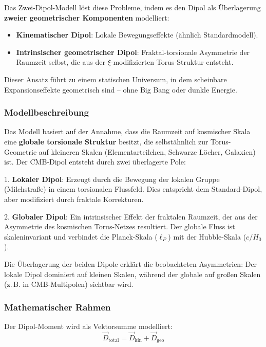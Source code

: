 	Das Zwei-Dipol-Modell löst diese Probleme, indem es den Dipol als Überlagerung \textbf{zweier geometrischer Komponenten} modelliert:
	\begin{itemize}
		\item \textbf{Kinematischer Dipol}: Lokale Bewegungseffekte (ähnlich Standardmodell).
		\item \textbf{Intrinsischer geometrischer Dipol}: Fraktal-torsionale Asymmetrie der Raumzeit selbst, die aus der $\xi$-modifizierten Torus-Struktur entsteht.
	\end{itemize}
	
	Dieser Ansatz führt zu einem statischen Universum, in dem scheinbare Expansionseffekte geometrisch sind – ohne Big Bang oder dunkle Energie.
	
	\subsubsection{Modellbeschreibung}
	
	Das Modell basiert auf der Annahme, dass die Raumzeit auf kosmischer Skala eine \textbf{globale torsionale Struktur} besitzt, die selbstähnlich zur Torus-Geometrie auf kleineren Skalen (Elementarteilchen, Schwarze Löcher, Galaxien) ist. Der CMB-Dipol entsteht durch zwei überlagerte Pole:
	
	1. \textbf{Lokaler Dipol}: Erzeugt durch die Bewegung der lokalen Gruppe (Milchstraße) in einem torsionalen Flussfeld. Dies entspricht dem Standard-Dipol, aber modifiziert durch fraktale Korrekturen.
	
	2. \textbf{Globaler Dipol}: Ein intrinsischer Effekt der fraktalen Raumzeit, der aus der Asymmetrie des kosmischen Torus-Netzes resultiert. Der globale Fluss ist skaleninvariant und verbindet die Planck-Skala ($\ell_P$) mit der Hubble-Skala ($c/H_0$).
	
	Die Überlagerung der beiden Dipole erklärt die beobachteten Asymmetrien: Der lokale Dipol dominiert auf kleinen Skalen, während der globale auf großen Skalen (z.\,B. in CMB-Multipolen) sichtbar wird.
	
	\subsubsection{Mathematischer Rahmen}
	
	Der Dipol-Moment wird als Vektorsumme modelliert:
	\begin{equation}
		\vec{D}_{\text{total}} = \vec{D}_{\text{kin}} + \vec{D}_{\text{geo}}
		\label{eq:two_dipole}
	\end{equation}
	
